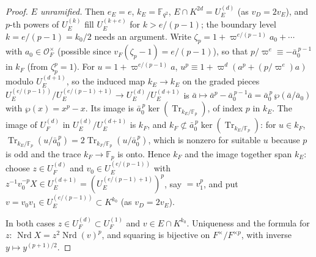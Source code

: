 \documentclass[11pt]{article}
\newcommand{\Fq}{\mathbb F}
\newcommand{\Nrd}{\operatorname{Nrd}}
\newcommand{\Tr}{\operatorname{Tr}}
\newcommand{\Ocal}{\mathcal O}
\theoremstyle{plain}
\theoremstyle{definition}
\begin{document}
\begin{proof}
\emph{$E$ unramified.}  Then $e_E=e$, $k_E=\Fq_{q^2}$, $E\cap K^{2d}=U_E^{(d)}$
(as $v_D=2v_E$), and $p$-th powers of $U_E^{(k)}$ fill $U_E^{(k+e)}$ for
$k>e/(p-1)$; the boundary level $k=e/(p-1)=k_0/2$ needs an argument.
Write $\zeta_p=1+\varpi^{e/(p-1)}a_0+\cdots$ with $a_0\in\Ocal_F^\times$
(possible since $v_F(\zeta_p-1)=e/(p-1)$), so that
$p/\varpi^{e}\equiv-\bar a_0^{\,p-1}$ in $k_F$ (from $\zeta_p^p=1$).  For
$u=1+\varpi^{e/(p-1)}a$, $u^p\equiv1+\varpi^d(a^p+(p/\varpi^e)a)$ modulo
$U_E^{(d+1)}$, so the induced map $k_E\to k_E$ on the graded pieces
$U_E^{(e/(p-1))}/U_E^{(e/(p-1)+1)}\to U_E^{(d)}/U_E^{(d+1)}$ is
$\bar a\mapsto\bar a^p-\bar a_0^{\,p-1}\bar a=\bar a_0^{\,p}\,\wp(\bar a/\bar a_0)$
with $\wp(x)=x^p-x$.  Its image is $\bar a_0^{\,p}\ker(\Tr_{k_E/\Fq_p})$, of
index $p$ in $k_E$.  The image of $U_F^{(d)}$ in $U_E^{(d)}/U_E^{(d+1)}$
is $k_F$, and $k_F\not\subset\bar a_0^{\,p}\ker(\Tr_{k_E/\Fq_p})$: for
$u\in k_F$, $\Tr_{k_E/\Fq_p}(u/\bar a_0^{\,p})=2\Tr_{k_F/\Fq_p}(u/\bar a_0^{\,p})$,
which is nonzero for suitable $u$ because $p$ is odd and the trace
$k_F\to\Fq_p$ is onto.  Hence $k_F$ and the image together span $k_E$:
choose $z\in U_F^{(d)}$ and $v_0\in U_E^{(e/(p-1))}$ with
$z^{-1}v_0^{-p}X\in U_E^{(d+1)}=(U_E^{(e/(p-1)+1)})^p$, say $=v_1^p$, and
put $v=v_0v_1\in U_E^{(e/(p-1))}\subset K^{k_0}$ (as $v_D=2v_E$).

In both cases $z\in U_F^{(d)}\subset U_F^{(1)}$ and $v\in E\cap K^{k_0}$.
Uniqueness and the formula for $z$: $\Nrd X=z^2\Nrd(v)^p$, and squaring
is bijective on $F^\times/F^{\times p}$, with inverse $y\mapsto y^{(p+1)/2}$.
\end{proof}
\end{document}
